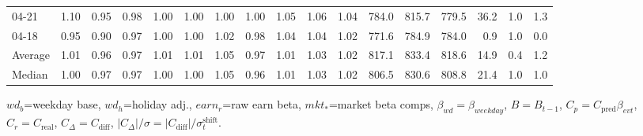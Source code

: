 \begin{threeparttable}
{\begin{tabular}{lrrrrrrrrrrrrrrrr}
  04-21 &   1.10 &   0.95 &         0.98 &     1.00 &           1.00 &        1.00 &        1.00 &        1.05 &          1.06 &          1.04 & 784.0 & 815.7 & 779.5 &       36.2 &                      1.0 &                 1.3 \\
  04-18 &   0.95 &   0.90 &         0.97 &     1.00 &           1.00 &        1.02 &        0.98 &        1.04 &          1.04 &          1.02 & 771.6 & 784.9 & 784.0 &        0.9 &                      1.0 &                 0.0 \\
Average &   1.01 &   0.96 &         0.97 &     1.01 &           1.01 &        1.05 &        0.97 &        1.01 &          1.03 &          1.02 & 817.1 & 833.4 & 818.6 &       14.9 &                      0.4 &                 1.2 \\
 Median &   1.00 &   0.97 &         0.97 &     1.00 &           1.00 &        1.05 &        0.96 &        1.01 &          1.03 &          1.02 & 806.5 & 830.6 & 808.8 &       21.4 &                      1.0 &                 1.0 \\
\bottomrule
\end{tabular}
}
\begin{tablenotes}\footnotesize
\item $wd_b$=weekday base, $wd_h$=holiday adj.,
$earn_r$=raw earn beta, $mkt_{*}$=market beta comps,
$\beta_{wd}=\beta_{weekday}$, $B=B_{t-1}$,
$C_p=C_{\text{pred}}\beta_{evt}$, $C_r=C_{\text{real}}$,
$C_\Delta=C_{\text{diff}}$, $|C_\Delta|/\sigma=|C_{\text{diff}}|/\sigma_t^{\text{shift}}$.
\end{tablenotes}
\end{threeparttable}
\endgroup
